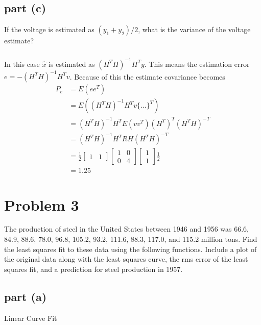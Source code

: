 \documentclass[11pt]{article}
\begin{document}
\subsection*{part (c)}
If the voltage is estimated as $(y_1+y_2)/2$, what is the variance of the voltage estimate?

\subparagraph*{}
In this case $\hat{x}$ is estimated as $(H^TH)^{-1}H^Ty$. This means the estimation error $e=-(H^TH)^{-1}H^Tv$. Because of this the estimate covariance becomes
\begin{align*}
	P_e &= E(ee^T) \\
	&= E((H^TH)^{-1}H^Tv\{\dots\}^T) \\
	&= (H^TH)^{-1} H^T E(vv^T) (H^T)^T(H^TH)^{-T} \\
	&= (H^TH)^{-1} H^T R H(H^TH)^{-T} \\
	&= \frac{1}{2} \begin{bmatrix} 1 & 1 \end{bmatrix} \begin{bmatrix} 1 & 0 \\ 0 & 4 \end{bmatrix} \begin{bmatrix} 1 \\ 1 \end{bmatrix} \frac{1}{2} \\
	&= 1.25
\end{align*}

\section*{Problem 3}
The production of steel in the United States between 1946 and 1956 was 66.6, 84.9, 88.6, 78.0, 96.8, 105.2, 93.2, 111.6, 88.3, 117.0, and 115.2 million tons. Find the least squares fit to these data using the following functions. Include a plot of the original data along with the least squares curve, the rms error of the least squares fit, and a prediction for steel production in 1957.

\subsection*{part (a)}
Linear Curve Fit
\end{document}
